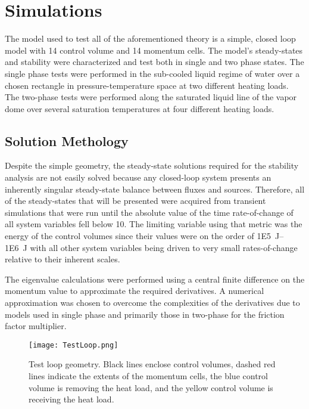 \chapter{Simulations}\label{Chapter:Simulations}

The model used to test all of the aforementioned theory is a simple, closed loop model with 14 control volume and 14 momentum cells.
The model's steady-states and stability were characterized and test both in single and two phase states.
The single phase tests were performed in the sub-cooled liquid regime of water over a chosen rectangle in pressure-temperature space at two different heating loads.
The two-phase tests were performed along the saturated liquid line of the vapor dome over several saturation temperatures at four different heating loads.

\section{Solution Methology}

Despite the simple geometry, the steady-state solutions required for the stability analysis are not easily solved because any closed-loop system presents an inherently singular steady-state balance between fluxes and sources.
Therefore, all of the steady-states that will be presented were acquired from transient simulations that were run until the absolute value of the time rate-of-change of all system variables fell below 10.
The limiting variable using that metric was the energy of the control volumes since their values were on the order of \SIrange{1E5}{1E6}{\joule} with all other system variables being driven to very small rates-of-change relative to their inherent scales.

The eigenvalue calculations were performed using a central finite difference on the momentum value to approximate the required derivatives.
A numerical approximation was chosen to overcome the complexities of the derivatives due to models used in single phase and primarily those in two-phase for the friction factor multiplier.


\begin{figure}[t]%
    \centering
    \caption{Test loop geometry.  Black lines enclose control volumes, dashed red lines indicate the extents of the momentum cells, the blue control volume is removing the heat load, and the yellow control volume is receiving the heat load.}%
    \label{Fig:TestLoopSetUp}%
    \texttt{[image: TestLoop.png]}%
\end{figure}



